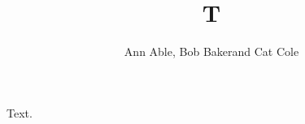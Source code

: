 \documentclass{article}
\begin{document}
\title{T}
\author{Ann Able\footnotemark[1], Bob Baker\footnotemark[1] and Cat Cole\footnotemark[1]}
\maketitle
{}
Text.
\end{document}
